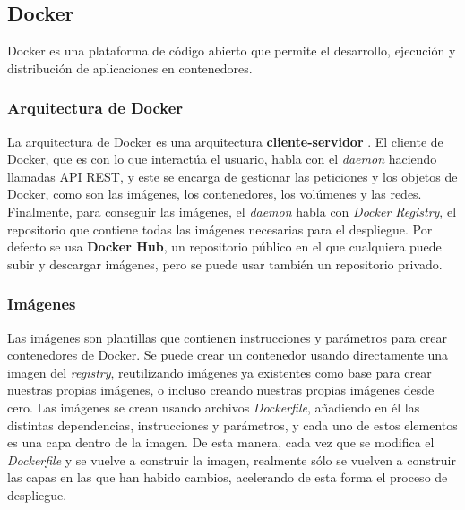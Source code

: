 \subsection{Docker}

Docker es una plataforma de código abierto que permite el desarrollo, ejecución y distribución de aplicaciones en contenedores.

\subsubsection{Arquitectura de Docker}

La arquitectura de Docker es una arquitectura \textbf{cliente-servidor} \cite{docker:overview-architecture}. El cliente de Docker, que es con lo que interactúa el usuario, habla con el \textit{daemon} haciendo llamadas API REST, y este se encarga de gestionar las peticiones y los objetos de Docker, como son las imágenes, los contenedores, los volúmenes y las redes. Finalmente, para conseguir las imágenes, el \textit{daemon} habla con \textit{Docker Registry}, el repositorio que contiene todas las imágenes necesarias para el despliegue. Por defecto se usa \textbf{Docker Hub}, un repositorio público en el que cualquiera puede subir y descargar imágenes, pero se puede usar también un repositorio privado.


\subsubsection{Imágenes}

Las imágenes son plantillas que contienen instrucciones y parámetros para crear contenedores de Docker. Se puede crear un contenedor usando directamente una imagen del \textit{registry}, reutilizando imágenes ya existentes como base para crear nuestras propias imágenes, o incluso creando nuestras propias imágenes desde cero. Las imágenes se crean usando archivos \textit{Dockerfile}, añadiendo en él las distintas dependencias, instrucciones y parámetros, y cada uno de estos elementos es una capa dentro de la imagen. De esta manera, cada vez que se modifica el \textit{Dockerfile} y se vuelve a construir la imagen, realmente sólo se vuelven a construir las capas en las que han habido cambios, acelerando de esta forma el proceso de despliegue.
\cite{docker:overview-objects}

